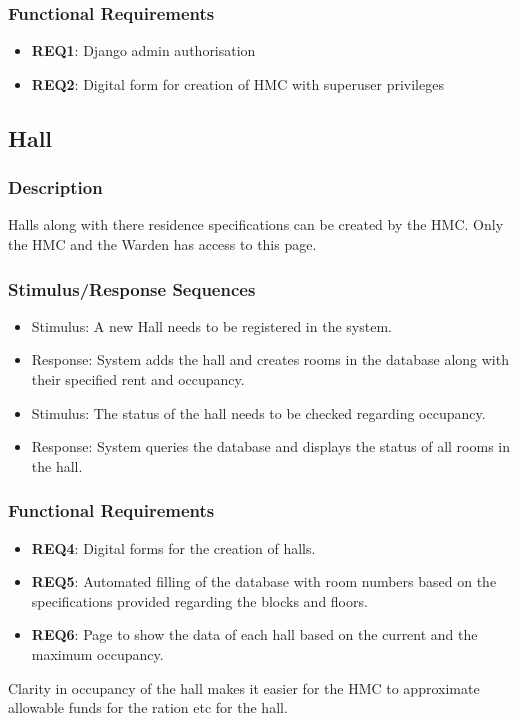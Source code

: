 \documentclass{scrreprt}
\begin{document}
\subsubsection{Functional Requirements}
\begin{itemize}
    \item \textbf{REQ1}: Django admin authorisation
    \item \textbf{REQ2}: Digital form for creation of HMC with superuser privileges
\end{itemize}

\subsection{Hall}
\subsubsection{Description}
Halls along with there residence specifications can be created by the HMC. Only the HMC and the Warden has access to this page.
\subsubsection{Stimulus/Response Sequences}
\begin{itemize}
    \item Stimulus: A new Hall needs to be registered in the system.
    \item Response: System adds the hall and creates rooms in the database along with their specified rent and occupancy.
\end{itemize}
\begin{itemize}
    \item Stimulus: The status of the hall needs to be checked regarding occupancy.
    \item Response: System queries the database and displays the status of all rooms in the hall.
\end{itemize}

\subsubsection{Functional Requirements}
\begin{itemize}
    \item \textbf{REQ4}: Digital forms for the creation of halls.
    \item \textbf{REQ5}:  Automated filling of the database with room numbers based on the specifications provided regarding the blocks and floors.
    \item \textbf{REQ6}: Page to show the data of each hall based on the current and the maximum occupancy.
\end{itemize}
Clarity in occupancy of the hall makes it easier for the HMC to approximate allowable funds for the ration etc for the hall.
\end{document}
